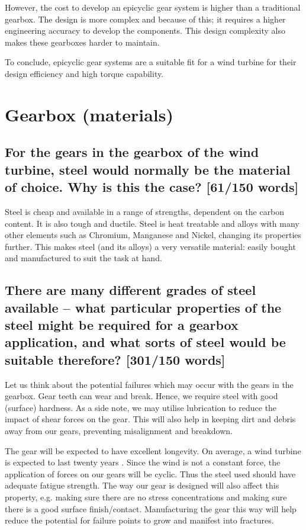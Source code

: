 \documentclass[12pt]{article}
\numberwithin{equation}{section}
\begin{document}
\begin{flushleft}
However, the cost to develop an epicyclic gear system is higher than a traditional gearbox. The design is more complex and because of this; it requires a higher engineering accuracy to develop the components. This design complexity also makes these gearboxes harder to maintain.

To conclude, epicyclic gear systems are a suitable fit for a wind turbine for their design efficiency and high torque capability.

\section{Gearbox (materials)}
\subsection{For the gears in the gearbox of the wind turbine, steel would normally be the material of choice. Why is this the case? [61/150 words]}
Steel is cheap and available in a range of strengths, dependent on the carbon content. It is also tough and ductile. Steel is heat treatable and alloys with many other elements such as Chromium, Manganese and Nickel, changing its properties further. This makes steel (and its alloys) a very versatile material: easily bought and manufactured to suit the task at hand.
\subsection{There are many different grades of steel available – what particular properties of the steel might be required for a gearbox application, and what sorts of steel would be suitable therefore? [301/150 words]}
Let us think about the potential failures which may occur with the gears in the gearbox. Gear teeth can wear and break. Hence, we require steel with good (surface) hardness. As a side note, we may utilise lubrication to reduce the impact of shear forces on the gear. This will also help in keeping dirt and debris away from our gears, preventing misalignment and breakdown. 

The gear will be expected to have excellent longevity. On average, a wind turbine is expected to last twenty years \citep{windTurbineLifetime}. Since the wind is not a constant force, the application of forces on our gears will be cyclic. Thus the steel used should have adequate fatigue strength. The way our gear is designed will also affect this property, e.g. making sure there are no stress concentrations and making sure there is a good surface finish/contact. Manufacturing the gear this way will help reduce the potential for failure points to grow and manifest into fractures. 


\end{flushleft}
\end{document}
